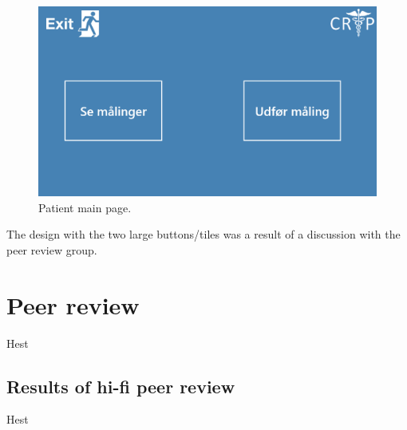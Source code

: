 \begin{figure}[H]
\centering
\includegraphics[width=.7\textwidth]{billeder/usermainpage_hifi.png}
\caption{Patient main page.}
\end{figure}
The design with the two large buttons/tiles was a result of a discussion with the peer review group.\\
\section{Peer review}
Hest

\subsection{Results of hi-fi peer review}
Hest